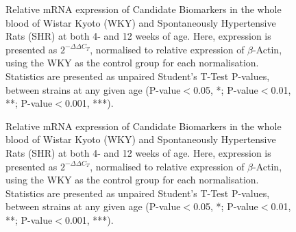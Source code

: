 \begin{figure}[!hbtp]
  \centering 
  \caption[qPCR Relative Expression of Blood Biomarkers]{Relative mRNA expression of Candidate Biomarkers in the whole blood of Wistar Kyoto (WKY) and Spontaneously Hypertensive Rats (SHR) at both 4- and 12 weeks of age. Here, expression is presented as $2^{-\Delta\Delta C_{T}}$, normalised to relative expression of $\beta$-Actin, using the WKY as the control group for each normalisation. Statistics are presented as unpaired Student's T-Test P-values, between strains at any given age (P-value$<$0.05, *; P-value$<$0.01, **; P-value$<$0.001, ***).}
  \label{fig:qPCRBlooda}
\end{figure}

\begin{figure}[!hbtp]
  \ContinuedFloat 
  \centering 
  \caption[qPCR Relative Expression of Blood Biomarkers. Cont.]{Relative mRNA expression of Candidate Biomarkers in the whole blood of Wistar Kyoto (WKY) and Spontaneously Hypertensive Rats (SHR) at both 4- and 12 weeks of age. Here, expression is presented as $2^{-\Delta\Delta C_{T}}$, normalised to relative expression of $\beta$-Actin, using the WKY as the control group for each normalisation. Statistics are presented as unpaired Student's T-Test P-values, between strains at any given age (P-value$<$0.05, *; P-value$<$0.01, **; P-value$<$0.001, ***).}
  \label{fig:qPCRBloodb}
\end{figure} 

